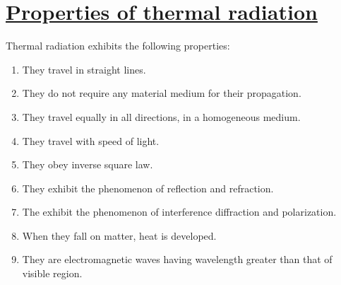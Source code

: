 \documentclass[14pt,a4paper]{article}
\begin{document}
\section{\underline{Properties of thermal radiation}}
Thermal radiation exhibits the following properties:
\begin{enumerate}
	\item They travel in straight lines.
	\item They do not require any material medium for their propagation.
	\item They travel equally in all directions, in a homogeneous medium.
	\item They travel with speed of light.
	\item They obey inverse square law.
	\item They exhibit the phenomenon of reflection and refraction.
	\item The exhibit the phenomenon of interference diffraction and polarization.
	\item When they fall on matter, heat is developed.
	\item They are electromagnetic waves having wavelength greater than that of visible region.
\end{enumerate}
\end{document}
